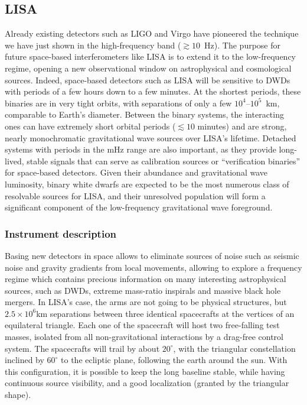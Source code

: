 \subsection{LISA}
Already existing detectors such as LIGO and Virgo have pioneered the technique we have just shown in the high-frequency band ($\gtrsim 10$~Hz).
The purpose for future space-based interferometers like LISA is to extend it to the low-frequency regime, opening a new observational window on astrophysical and cosmological sources.
Indeed, space-based detectors such as LISA will be sensitive to DWDs with periods of a few hours down to a few minutes.  
At the shortest periods, these binaries are in very tight orbits, with separations of only a few $10^{4}$–$10^{5}$~km, comparable to Earth's diameter.
Between the binary systems, the interacting ones can have extremely short orbital periods ($\lesssim 10$ minutes) and are strong, nearly monochromatic gravitational wave sources over LISA's lifetime.  
Detached systems with periods in the mHz range are also important, as they provide long-lived, stable signals that can serve as calibration sources or ``verification binaries'' for space-based detectors.
Given their abundance and gravitational wave luminosity, binary white dwarfs are expected to be the most numerous class of resolvable sources for LISA, and their unresolved population will form a significant component of the low-frequency gravitational wave foreground.

\subsubsection{Instrument description}
Basing new detectors in space allows to eliminate sources of noise such as seismic noise and gravity gradients from local movements, allowing to explore a frequency regime which contains precious information on many interesting astrophysical sources, such as DWDs, extreme mass-ratio inspirals and massive black hole mergers.
In LISA's case, the arms are not going to be physical structures, but $2.5\times10^6$km separations between three identical spacecrafts at the vertices of an equilateral triangle.
Each one of the spacecraft will host two free-falling test masses, isolated from all non-gravitational interactions by a drag-free control system.
The spacecrafts will trail by about $20^{\circ}$, with the triangular constellation inclined by $60^{\circ}$ to the ecliptic plane, following the earth around the sun.
With this configuration, it is possible to keep the long baseline stable, while having continuous source visibility, and a good localization (granted by the triangular shape).


